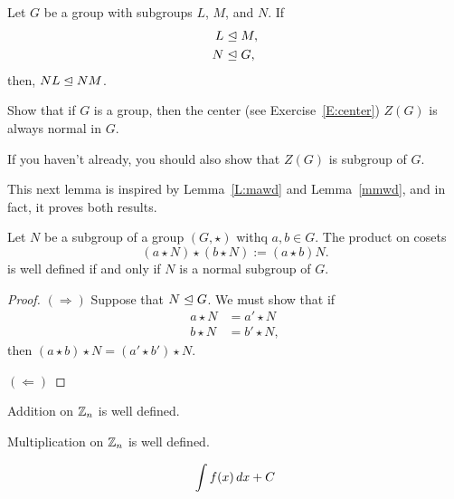 \documentclass{ximera}
\begin{document}
\begin{exercise}
  Let $G$ be a group with subgroups $L$, $M$, and $N$. If
  \begin{align*}
    L &\trianglelefteq M,\\
    N &\trianglelefteq G,
  \end{align*}
  then, $NL\trianglelefteq NM$.
\end{exercise}

\begin{exercise}
  Show that if $G$ is a group, then the center (see
  Exercise~\ref{E:center}) $Z(G)$ is always normal in $G$.

  If you haven't already, you should also show that $Z(G)$ is subgroup
  of $G$.
\end{exercise}



This next lemma is inspired by Lemma~\ref{L:mawd} and
Lemma~\ref{mmwd}, and in fact, it proves both results.

\begin{lemma}
  Let $N$ be a subgroup of a group $(G,\star)$ withq $a,b\in G$.  The
  product on cosets
  \[
  (a\star N) \star (b\star N ) := (a\star b) N.
  \]
  is well defined if and only if $N$ is a normal subgroup of $G$.
  \begin{proof}
    $(\Rightarrow)$ Suppose that $N\trianglelefteq G$. We must show that if
    \begin{align*}
      a\star N &= a'\star N\\
      b\star N &= b'\star N,
    \end{align*}
    then $(a\star b) \star N = (a'\star b')\star N$.

    $(\Leftarrow)$
  \end{proof}
  
\end{lemma}

\begin{corollary}
  Addition on $\mathbb Z_n$ is well defined.
\end{corollary}


\begin{corollary}
  Multiplication on $\mathbb Z_n$ is well defined.
\end{corollary}






\[
\int f(x) \, d x + C
\]
\end{document}
